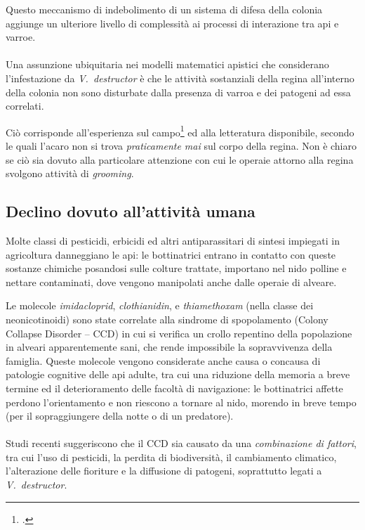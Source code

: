 Questo meccanismo di indebolimento di un sistema di difesa della colonia aggiunge un ulteriore livello di complessità ai processi di interazione tra api e varroe.

\paragraph{}
Una assunzione ubiquitaria nei modelli matematici apistici che considerano l'infestazione da \emph{V.~destructor} è
che le attività sostanziali della regina all'interno della colonia non sono disturbate dalla presenza di varroa e dei patogeni ad essa correlati.

Ciò corrisponde all'esperienza sul campo\footcite{privFDL,privFPan} ed alla letteratura disponibile, secondo le quali l'acaro non si trova \emph{praticamente mai} sul corpo della regina. Non è chiaro  se ciò sia dovuto alla particolare attenzione con cui le operaie attorno alla regina svolgono attività di \emph{grooming}.

\subsection{Declino dovuto all'attività umana}
\label{ssec:declinoUmano}
Molte classi di pesticidi, erbicidi ed altri antiparassitari di sintesi impiegati in agricoltura danneggiano le api: le bottinatrici entrano in contatto con queste sostanze chimiche posandosi sulle colture trattate, importano nel nido polline e nettare contaminati, dove vengono manipolati anche dalle operaie di alveare.

Le molecole \emph{imidacloprid}, \emph{clothianidin}, e \emph{thiamethoxam} (nella classe dei neonicotinoidi) sono state correlate alla sindrome di spopolamento (Colony Collapse Disorder -- CCD) in cui si verifica un crollo repentino della popolazione in alveari apparentemente sani, che rende impossibile la sopravvivenza della famiglia.
Queste molecole vengono considerate anche causa o concausa di patologie cognitive delle api adulte, tra cui una riduzione della memoria a breve termine ed il deterioramento delle facoltà di navigazione: le bottinatrici affette perdono l'orientamento e non riescono a tornare al nido, morendo in breve tempo (per il sopraggiungere della notte o di un predatore).

\paragraph{}
Studi recenti suggeriscono che il CCD sia causato da una \emph{combinazione di fattori}, tra cui l’uso di pesticidi,
la perdita di biodiversità, il cambiamento climatico, l’alterazione delle fioriture e la diffusione di patogeni,
soprattutto legati a \emph{V.~destructor}.

